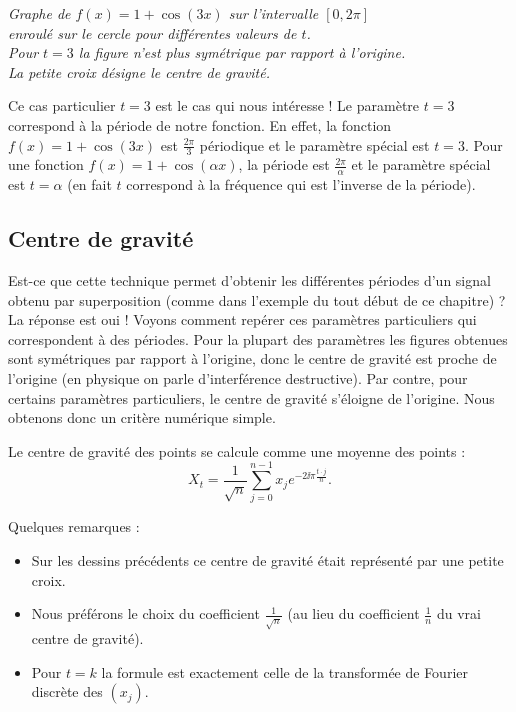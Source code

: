 \documentclass[11pt,class=report,crop=false]{standalone}
\begin{document}
\begin{center}
\medskip

\nopagebreak


\begin{minipage}{0.8\textwidth}
  \center\emph{Graphe de $f(x) = 1+\cos(3x)$ sur l'intervalle $[0,2\pi]$\\
    enroulé sur le cercle pour différentes valeurs de $t$.\\
    Pour $t=3$ la figure n'est plus symétrique par rapport à l'origine.\\
    La petite croix désigne le centre de gravité.
}
\end{minipage}

\end{center}

Ce cas particulier $t=3$ est le cas qui nous intéresse ! Le paramètre $t=3$ correspond à la période de notre fonction. En effet, la fonction $f(x) = 1 + \cos(3x)$ est $\frac{2\pi}{3}$ périodique et le paramètre spécial est $t=3$.
Pour une fonction $f(x) = 1 + \cos(\alpha x)$, la période est $\frac{2\pi}{\alpha}$ et le paramètre spécial est $t=\alpha$ (en fait $t$ correspond à la fréquence qui est l'inverse de la période). 






\subsection{Centre de gravité}


Est-ce que cette technique permet d'obtenir les différentes périodes d'un signal obtenu par superposition (comme dans l'exemple du tout début de ce chapitre) ? La réponse est oui !
Voyons comment repérer ces paramètres particuliers qui correspondent à des périodes.
Pour la plupart des paramètres les figures obtenues sont symétriques par rapport à l'origine, donc le centre de gravité est proche de l'origine (en physique on parle d'interférence destructive). Par contre, pour certains paramètres particuliers, le centre de gravité s'éloigne de l'origine. Nous obtenons donc un critère numérique simple.

Le centre de gravité des points se calcule comme une moyenne des points :
$$X_t = \frac{1}{\sqrt n}\sum_{j=0}^{n-1} x_j e^{-2\ii\pi \frac{t \cdot j}{n}}.$$

Quelques remarques :
\begin{itemize}
  \item Sur les dessins précédents ce centre de gravité était représenté par une petite croix.
  \item Nous préférons le choix du coefficient $\frac{1}{\sqrt n}$  (au lieu du coefficient $\frac1n$ du vrai centre de gravité).
  \item Pour $t=k$ la formule est exactement celle de la transformée de Fourier discrète des $(x_j)$.
\end{itemize}
\end{document}
